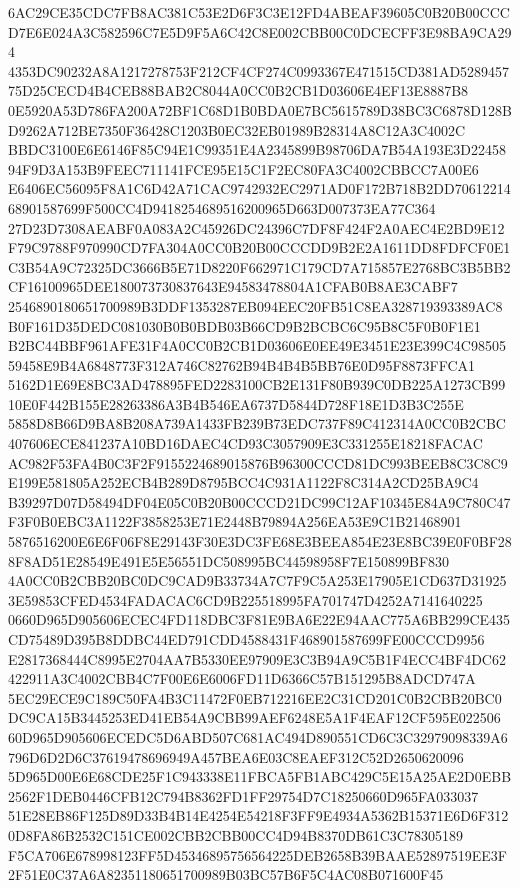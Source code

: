 \documentclass[UTF8,fontset=fandol,zihao=-4,a4paper]{ctexart}
\begin{document}
{{6AC29CE35CDC7FB8AC381C53E2D6F3C3E12FD4ABEAF39605C0B20B00CCCD7E6E024A3C582596C7E5D9F5A6C42C8E002CBB00C0DCECFF3E98BA9CA294
4353DC90232A8A1217278753F212CF4CF274C0993367E471515CD381AD528945775D25CECD4B4CEB88BAB2C8044A0CC0B2CB1D03606E4EF13E8887B8
0E5920A53D786FA200A72BF1C68D1B0BDA0E7BC5615789D38BC3C6878D128BD9262A712BE7350F36428C1203B0EC32EB01989B28314A8C12A3C4002C
BBDC3100E6E6146F85C94E1C99351E4A2345899B98706DA7B54A193E3D2245894F9D3A153B9FEEC711141FCE95E15C1F2EC80FA3C4002CBBCC7A00E6
E6406EC56095F8A1C6D42A71CAC9742932EC2971AD0F172B718B2DD7061221468901587699F500CC4D9418254689516200965D663D007373EA77C364
27D23D7308AEABF0A083A2C45926DC24396C7DF8F424F2A0AEC4E2BD9E12F79C9788F970990CD7FA304A0CC0B20B00CCCDD9B2E2A1611DD8FDFCF0E1
C3B54A9C72325DC3666B5E71D8220F662971C179CD7A715857E2768BC3B5BB2CF16100965DEE180073730837643E94583478804A1CFAB0B8AE3CABF7
2546890180651700989B3DDF1353287EB094EEC20FB51C8EA328719393389AC8B0F161D35DEDC081030B0B0BDB03B66CD9B2BCBC6C95B8C5F0B0F1E1
B2BC44BBF961AFE31F4A0CC0B2CB1D03606E0EE49E3451E23E399C4C9850559458E9B4A6848773F312A746C82762B94B4B4B5BB76E0D95F8873FFCA1
5162D1E69E8BC3AD478895FED2283100CB2E131F80B939C0DB225A1273CB9910E0F442B155E28263386A3B4B546EA6737D5844D728F18E1D3B3C255E
5858D8B66D9BA8B208A739A1433FB239B73EDC737F89C412314A0CC0B2CBC407606ECE841237A10BD16DAEC4CD93C3057909E3C331255E18218FACAC
AC982F53FA4B0C3F2F9155224689015876B96300CCCD81DC993BEEB8C3C8C9E199E581805A252ECB4B289D8795BCC4C931A1122F8C314A2CD25BA9C4
B39297D07D58494DF04E05C0B20B00CCCD21DC99C12AF10345E84A9C780C47F3F0B0EBC3A1122F3858253E71E2448B79894A256EA53E9C1B21468901
5876516200E6E6F06F8E29143F30E3DC3FE68E3BEEA854E23E8BC39E0F0BF288F8AD51E28549E491E5E56551DC508995BC44598958F7E150899BF830
4A0CC0B2CBB20BC0DC9CAD9B33734A7C7F9C5A253E17905E1CD637D319253E59853CFED4534FADACAC6CD9B225518995FA701747D4252A7141640225
0660D965D905606ECEC4FD118DBC3F81E9BA6E22E94AAC775A6BB299CE435CD75489D395B8DDBC44ED791CDD4588431F468901587699FE00CCCD9956
E2817368444C8995E2704AA7B5330EE97909E3C3B94A9C5B1F4ECC4BF4DC62422911A3C4002CBB4C7F00E6E6006FD11D6366C57B151295B8ADCD747A
5EC29ECE9C189C50FA4B3C11472F0EB712216EE2C31CD201C0B2CBB20BC0DC9CA15B3445253ED41EB54A9CBB99AEF6248E5A1F4EAF12CF595E022506
60D965D905606ECEDC5D6ABD507C681AC494D890551CD6C3C32979098339A6796D6D2D6C37619478696949A457BEA6E03C8EAEF312C52D2650620096
5D965D00E6E68CDE25F1C943338E11FBCA5FB1ABC429C5E15A25AE2D0EBB2562F1DEB0446CFB12C794B8362FD1FF29754D7C18250660D965FA033037
51E28EB86F125D89D33B4B14E4254E54218F3FF9E4934A5362B15371E6D6F3120D8FA86B2532C151CE002CBB2CBB00CC4D94B8370DB61C3C78305189
F5CA706E678998123FF5D45346895756564225DEB2658B39BAAE52897519EE3F2F51E0C37A6A82351180651700989B03BC57B6F5C4AC08B071600F45
}}
\end{document}

